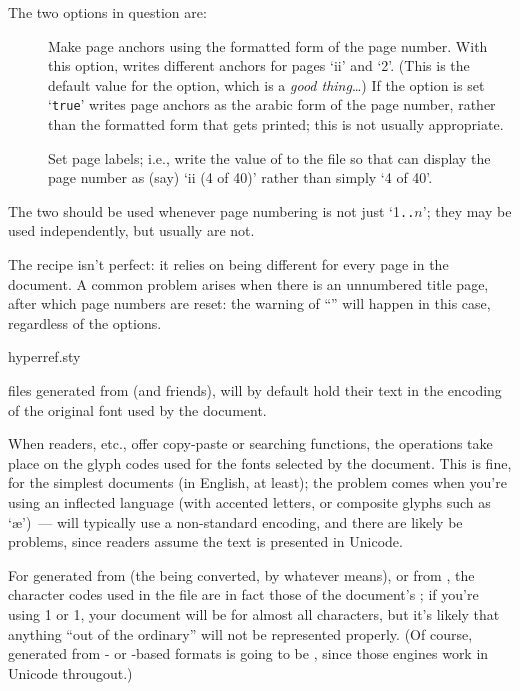 The two options in question are:
\begin{description}
\item[] Make page anchors using the
  formatted form of the page number.  With this option,
   writes different anchors for pages `ii' and `2'.
  (This is the default value for the option, which is a %
  \emph{good thing}\dots{})
  If the option is set `\texttt{true}'  writes page
  anchors as the arabic form of the page number, rather than the
  formatted form that gets printed; this is not usually appropriate.
\item[] Set  page labels; i.e.,
  write the value of  to the  file so that
   can display the page number as (say) `ii (4
  of 40)' rather than simply `4 of 40'.
\end{description}
The two should be used whenever page numbering is not just
`1\texttt{..}\ensuremath{n}'; they may be used independently, but
usually are not.

The recipe isn't perfect: it relies on  being different
for every page in the document.  A common problem arises when there is
an unnumbered title page, after which page numbers are reset: the
\PDFTeX{} warning of ``''
will happen in this case, regardless of the options.
\begin{ctanrefs}
\item[hyperref.sty]
\end{ctanrefs}


 files generated from \tex{} (and friends), will by default
hold their text in the encoding of the original \tex{} font used by
the document.

When  readers, etc., offer copy-paste or searching
functions, the operations take place on the glyph codes used for the
fonts selected by the document.  This is fine, for the simplest
documents (in English, at least); the problem comes when you're using
an inflected language (with accented letters, or composite glyphs
such as `\ae{}')~--- \tex{} will typically use a non-standard
encoding, and there are likely be problems, since  readers
assume the text is presented in Unicode.

For  generated from \latex{} (the  being
converted, by whatever means), or from \pdflatex{}, the character
codes used in the  file are in fact those of the document's
; if you're using 1 or
1, your document will be  for almost all 
characters, but it's likely that anything ``out of the ordinary'' will
not be represented properly.  (Of course,  generated from
\xetex{}- or \luatex{}-based formats is going to be , since
those engines work in Unicode througout.)

